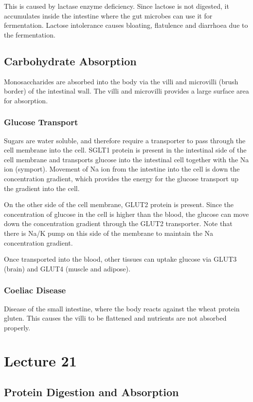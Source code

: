 \documentclass[a4paper, 12pt]{report}
\newcommand{\mychapter}[2]{
    \setcounter{chapter}{#1}
    \setcounter{section}{0}
    \chapter*{#2}
    \addcontentsline{toc}{chapter}{#2}
}
\begin{document}
This is caused by lactase enzyme deficiency.
Since lactose is not digested, it accumulates inside the intestine where the gut microbes can use it for fermentation.
Lactose intolerance causes bloating, flatulence and diarrhoea due to the fermentation.

\section{Carbohydrate Absorption}

Monosaccharides are absorbed into the body via the villi and microvilli (brush border) of the intestinal wall.
The villi and microvilli provides a large surface area for absorption.

\subsection{Glucose Transport}

Sugars are water soluble, and therefore require a transporter to pass through the cell membrane into the cell.
SGLT1 protein is present in the intestinal side of the cell membrane and transports glucose into the intestinal cell together with the Na ion (symport).
Movement of Na ion from the intestine into the cell is down the concentration gradient, which provides the energy for the glucose transport up the gradient into the cell.

On the other side of the cell membrane, GLUT2 protein is present.
Since the concentration of glucose in the cell is higher than the blood, the glucose can move down the concentration gradient through the GLUT2 transporter.
Note that there is Na/K pump on this side of the membrane to maintain the Na concentration gradient.

Once transported into the blood, other tissues can uptake glucose via GLUT3 (brain) and GLUT4 (muscle and adipose).

\subsection{Coeliac Disease}

Disease of the small intestine, where the body reacts against the wheat protein gluten.
This causes the villi to be flattened and nutrients are not absorbed properly.

\mychapter{21}{Lecture 21}

\section{Protein Digestion and Absorption}
\end{document}
